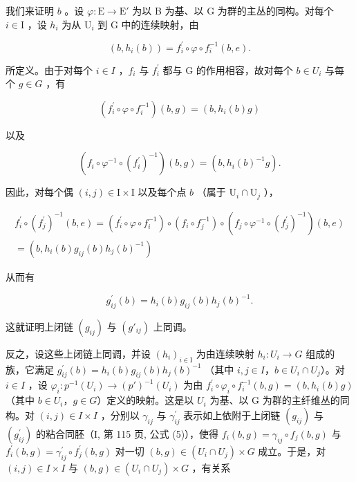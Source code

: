 我们来证明 \(b\) 。设 \(\varphi: \mathrm{E} \to \mathrm{E}'\) 为以 B 为基、以 G 为群的主丛的同构。对每个 \(i \in \mathrm{I}\) ，设 \(h_i\) 为从 \(\mathrm{U}_i\) 到 G 中的连续映射，由

\[
(b, h _ {i} (b)) = f _ {i} ^ {\prime} \circ \varphi \circ f _ {i} ^ {- 1} (b, e).
\]

所定义。由于对每个 \(i \in I\) ，\(f_{i}\) 与 \(f_{i}^{\prime}\) 都与 G 的作用相容，故对每个 \(b \in U_{i}\) 与每个 \(g \in G\) ，有

\[
(f _ {i} ^ {\prime} \circ \varphi \circ f _ {i} ^ {- 1}) (b, g) = (b, h _ {i} (b) g)
\]

以及

\[
(f _ {i} \circ \varphi^ {- 1} \circ (f _ {i} ^ {\prime}) ^ {- 1}) (b, g) = (b, h _ {i} (b) ^ {- 1} g).
\]

因此，对每个偶 \((i,j)\in \mathrm{I}\times \mathrm{I}\) 以及每个点 \(b\) （属于 \(\mathrm{U}_i\cap \mathrm{U}_j\) ），

\[
\begin{array}{c} f _ {i} ^ {\prime} \circ (f _ {j} ^ {\prime}) ^ {- 1} (b, e) = (f _ {i} ^ {\prime} \circ \varphi \circ f _ {i} ^ {- 1}) \circ (f _ {i} \circ f _ {j} ^ {- 1}) \circ (f _ {j} \circ \varphi^ {- 1} \circ (f _ {j} ^ {\prime}) ^ {- 1}) (b, e) \\ = (b, h _ {i} (b) g _ {i j} (b) h _ {j} (b) ^ {- 1}) \end{array}
\]

从而有

\[
g _ {i j} ^ {\prime} (b) = h _ {i} (b) g _ {i j} (b) h _ {j} (b) ^ {- 1}.
\]

这就证明上闭链 \((g_{ij})\) 与 \((g'_{ij})\) 上同调。

反之，设这些上闭链上同调，并设 \((h_{i})_{i\in\mathrm{I}}\) 为由连续映射 \(h_{i}\colon U_{i}\to G\) 组成的族，它满足 \(g_{ij}^{\prime}(b)=h_{i}(b)g_{ij}(b)h_{j}(b)^{-1}\) （其中 \(i,j\in I\)，\(b\in U_{i}\cap U_{j}\)）。对 \(i\in I\) ，设 \(\varphi_{i}\colon p^{-1}(U_{i})\to(p')^{-1}(U_{i})\) 为由 \(f_{i}^{\prime}\circ\varphi_{i}\circ f_{i}^{-1}(b,g)=(b,h_{i}(b)g)\) （其中 \(b\in U_{i}\)，\(g\in G\)）定义的映射。这是以 \(U_{i}\) 为基、以 G 为群的主纤维丛的同构。对 \((i,j)\in I\times I\) ，分别以 \(\gamma_{ij}\) 与 \(\gamma_{ij}^{\prime}\) 表示如上依附于上闭链 \((g_{ij})\) 与 \((g_{ij}^{\prime})\) 的粘合同胚（I, 第 115 页, 公式 (5)），使得 \(f_{i}(b,g)=\gamma_{ij}\circ f_{j}(b,g)\) 与 \(f_{i}^{\prime}(b,g)=\gamma_{ij}^{\prime}\circ f_{j}^{\prime}(b,g)\) 对一切 \((b,g)\in(U_{i}\cap U_{j})\times G\) 成立。于是，对 \((i,j)\in I\times I\) 与 \((b,g)\in(U_{i}\cap U_{j})\times G\) ，有关系

